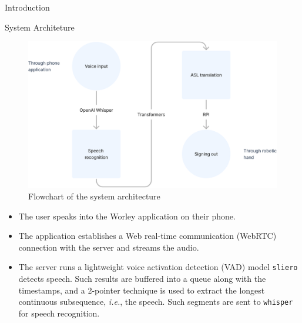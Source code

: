 \documentclass[final, 20pt]{beamer}
\def\ie{\textit{i.e.}\xspace}
\newlength{\colwidth}
\newlength{\twocolwidth}
\begin{document}
\begin{frame}[t]
\begin{columns}[t]
\begin{column}{\twocolwidth}
\begin{block}{Introduction}
\begin{multicols}{2}
        \end{multicols}
      \end{block}

      \begin{block}{System Architeture}
        \begin{minipage}{0.48\linewidth}
          \begin{figure}[ht]
            \centering
            \includegraphics[width=\linewidth]{images/flowchart.png}
            \caption{Flowchart of the system architecture}
            \label{fig:flowchart}
          \end{figure}
        \end{minipage}\hfill%
        \begin{minipage}{0.48\linewidth}
          \begin{itemize}
            \item The user speaks into the Worley application on their phone.
            \item The application establishes a Web real-time communication (WebRTC) connection with the server and streams the audio.
            \item The server runs a lightweight voice activation detection (VAD) model \texttt{sliero} detects speech. Such results are buffered into a queue along with the timestamps, and a 2-pointer technique is used to extract the longest continuous subsequence, \ie, the speech. Such segments are sent to \texttt{whisper} for speech recognition.

\end{itemize}
\end{minipage}
\end{block}
\end{column}
\end{columns}
\end{frame}
\end{document}
